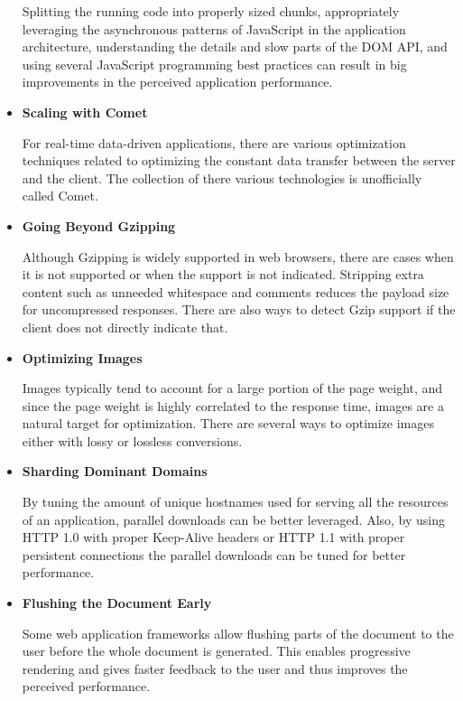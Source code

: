 \begin{itemize}
  Splitting the running code into properly sized chunks, appropriately
  leveraging the asynchronous patterns of JavaScript in the
  application architecture, understanding the details and slow parts
  of the DOM API, and using several JavaScript programming best
  practices can result in big improvements in the perceived
  application performance. \cite{zakas2010high}

\item \textbf{Scaling with Comet}

  For real-time data-driven applications, there are various
  optimization techniques related to optimizing the constant data
  transfer between the server and the client. The collection of there
  various technologies is unofficially called Comet.

\item \textbf{Going Beyond Gzipping}

  Although Gzipping is widely supported in web browsers, there are
  cases when it is not supported or when the support is not
  indicated. Stripping extra content such as unneeded whitespace and
  comments reduces the payload size for uncompressed responses. There
  are also ways to detect Gzip support if the client does not directly
  indicate that.

\item \textbf{Optimizing Images}

  Images typically tend to account for a large portion of the page
  weight, and since the page weight is highly correlated to the
  response time, images are a natural target for optimization. There
  are several ways to optimize images either with lossy or lossless
  conversions.

\item \textbf{Sharding Dominant Domains}

  By tuning the amount of unique hostnames used for serving all the
  resources of an application, parallel downloads can be better
  leveraged. Also, by using HTTP 1.0 with proper Keep-Alive headers or
  HTTP 1.1 with proper persistent connections the parallel downloads
  can be tuned for better performance.

\item \textbf{Flushing the Document Early}

  Some web application frameworks allow flushing parts of the document
  to the user before the whole document is generated. This enables
  progressive rendering and gives faster feedback to the user and thus
  improves the perceived performance.


\end{itemize}
